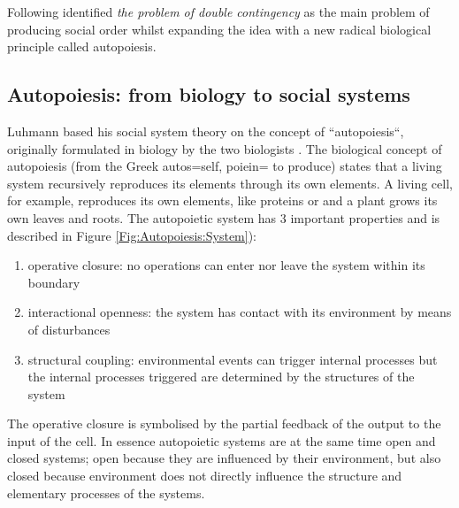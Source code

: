 Following \citet{Talcott1968:SocioTheory,Luhmann95}
identified \textit{the problem of double contingency} as the main problem of
producing social order whilst expanding the idea with a new radical biological
principle called autopoiesis.

\subsection{Autopoiesis: from biology to social systems}
Luhmann based his social system theory on the concept of ``autopoiesis``,
originally formulated in biology by the two biologists \citet{Maturana1980}.
The biological concept of autopoiesis (from the Greek autos=self, poiein= to produce)
states that a living system recursively reproduces its elements through its own elements.
A living cell, for example, reproduces its own elements, like proteins or
and a plant grows its own leaves and roots.
The autopoietic system has 3 important properties and is described in Figure \ref{Fig:Autopoiesis:System}):
\begin{enumerate}
 \item operative closure: no operations can enter nor leave the system within its boundary
 \item interactional openness: the system has contact with its environment by means of disturbances
 \item structural coupling: environmental events can trigger internal processes but the internal
processes triggered are determined by the structures of the system
\end{enumerate}
The operative closure is symbolised by the partial feedback of the output to the 
input of the cell.
In essence autopoietic systems are at the same time open and closed systems;
open because they are influenced by their environment,
but also closed because environment does not directly
influence the structure and elementary processes of the systems.

